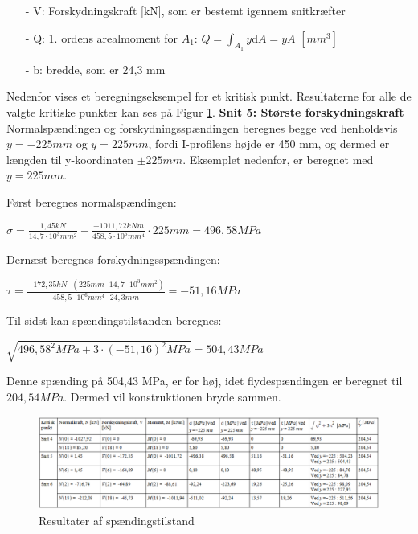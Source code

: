 \begin{itemize}
	\item[-] V: Forskydningskraft [kN], som er bestemt igennem snitkræfter
	\item[-] Q: 1. ordens arealmoment for $A_1$: $Q = \int_{A_1}y \mathrm{d}A = yA$ $[mm^3]$
	\item[-] b: bredde, som er 24,3 mm
\end{itemize}

Nedenfor vises et beregningseksempel for et kritisk punkt. Resultaterne for alle de valgte kritiske punkter kan ses på Figur \ref{fig:tabelspanding}. 
\newline
\newline
\textbf{Snit 5: Største forskydningskraft}
Normalspændingen og forskydningsspændingen beregnes begge ved henholdsvis $y = -225 mm$ og $y = 225 mm$, fordi I-profilens højde er 450 mm, og dermed er længden til y-koordinaten $\pm 225 mm$. Eksemplet nedenfor, er beregnet med $y = 225 mm$.

Først beregnes normalspændingen:
\begin{center}
	$\sigma = \frac{1,\!45 kN}{14,\!7 \cdot 10^3 mm^2} - \frac{-1011,\!72 kNm}{458,\!5 \cdot 10^6 mm^4} \cdot 225 mm = 496,\!58 MPa$
\end{center}

Dernæst beregnes forskydningsspændingen:
\begin{center}
	$\tau = \frac{-172,\!35 kN \cdot (225 mm \cdot 14,\!7\cdot10^3 mm^2)}{458,\!5\cdot10^6 mm^4 \cdot 24,\!3 mm} = -51,\!16 MPa$
\end{center}

Til sidst kan spændingstilstanden beregnes:
\begin{center}
	$\sqrt{496,\!58^2 MPa + 3 \cdot (-51,\!16)^2 MPa} = 504,\!43 MPa$
\end{center}

Denne spænding på 504,43 MPa, er for høj, idet flydespændingen er beregnet til $204,\!54 MPa$. Dermed vil konstruktionen bryde sammen.

 \begin{figure}[H]
 	\centering
 	\includegraphics[width=1.2\textwidth]{billeder/tabelspanding.png}
 	\caption{Resultater af spændingstilstand}
 	\label{fig:tabelspanding}
 \end{figure}

